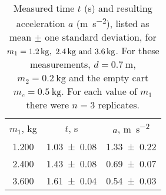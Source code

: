 \begin{table}[hb]
\caption{\label{tab:newtable1} Measured time $t$ (\unit{\second}) and resulting acceleration $a$ (\unit{\meter\per\second\squared}), listed as mean $\pm$ one standard deviation, for $m_1=\qtylist{1.2;2.4;3.6}{\kilo\gram}$. For these measurements, $d=\qty{0.7}{\meter}$, $m_2=\qty{0.2}{\kilo\gram}$ and the empty cart $m_c=\qty{0.5}{\kilo\gram}$. For each value of $m_1$ there were $n=3$ replicates. }
\begin{center}
\begin{ruledtabular}
\begin{tabular}{ccc}
$m_1$, \unit{\kilo\gram} & $t$, \unit{\second} & $a$, \unit{\meter\per\second\squared} \\ 
\colrule
\num{1.200} & \num{1.03\pm0.08} & \num{1.33\pm0.22} \\ 
\num{2.400} & \num{1.43\pm0.08} & \num{0.69\pm0.07} \\ 
\num{3.600} & \num{1.61\pm0.04} & \num{0.54\pm0.03} \\ 
\end{tabular}
\end{ruledtabular}
\end{center}
\end{table}
